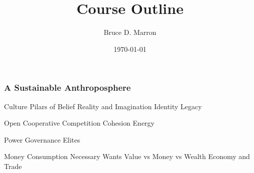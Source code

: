 \documentclass[12pt, letterpaper]{article}
\title{\vspace{-15mm}\fontsize{14pt}{10pt}
                    \selectfont \textbf{Course Outline}   %
                    \vspace{-7mm}
      }
\author{
     \normalsize Bruce D. Marron \\                     %
     \vspace{-5mm}
}
\date{\normalsize \today}
\begin{document}
\begin{singlespacing}
\end{singlespacing}
\thispagestyle{fancy}                           %


\setcounter{subsubsection}{4} %
\subsubsection{A Sustainable Anthroposphere}
\begin{outline}[enumerate]
\1 Culture
\2 Pilars of Belief
\3 Reality and Imagination
\3 Identity Legacy

\2 Open Cooperative Competition
\3 Cohesion
\3 Energy
\3


\1 Power
\2 Governance
\2 Elites


\1 Money
\2 Consumption
\3 Necessary
\3 Wants
\2 Value vs Money vs Wealth
\2 Economy and Trade

\end{outline}







\clearpage 
\renewcommand{\thepage}{}
\printbibliography
\end{document}
